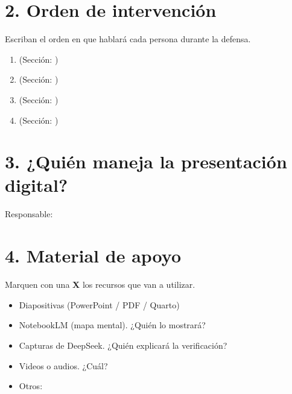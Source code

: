 \documentclass[11pt,letterpaper]{article}
\newcommand{\texto}[2][]{\TextField[#1]{#2}}
\newcommand{\casilla}[2][]{\CheckBox[#1]{}{#2}}
\begin{document}
\section*{2. Orden de intervención}
Escriban el orden en que hablará cada persona durante la defensa.

\begin{enumerate}
    \item \texto[name=orden1,width=10cm]{} \hspace{0.3cm} (Sección: \texto[name=seccion1,width=5cm]{})
    \item \texto[name=orden2,width=10cm]{} \hspace{0.3cm} (Sección: \texto[name=seccion2,width=5cm]{})
    \item \texto[name=orden3,width=10cm]{} \hspace{0.3cm} (Sección: \texto[name=seccion3,width=5cm]{})
    \item \texto[name=orden4,width=10cm]{} \hspace{0.3cm} (Sección: \texto[name=seccion4,width=5cm]{})
\end{enumerate}

\section*{3. ¿Quién maneja la presentación digital?}
Responsable: \texto[name=responsable,width=8cm]{}

\section*{4. Material de apoyo}
Marquen con una \textbf{X} los recursos que van a utilizar.

\begin{itemize}
    \item \casilla[name=diapositivas]{} Diapositivas (PowerPoint / PDF / Quarto)
    \item \casilla[name=notebooklm]{} NotebookLM (mapa mental). ¿Quién lo mostrará? \texto[name=quien_notebook,width=5cm]{}
    \item \casilla[name=capturas_deepseek]{} Capturas de DeepSeek. ¿Quién explicará la verificación? \texto[name=quien_verificacion,width=5cm]{}
    \item \casilla[name=videos]{} Videos o audios. ¿Cuál? \texto[name=video_desc,width=6cm]{}
    \item \casilla[name=otros]{} Otros: \texto[name=otros_texto,width=6cm]{}
\end{itemize}
\end{document}
